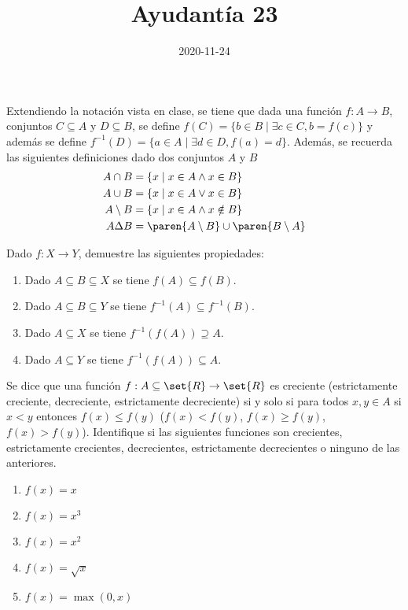 \documentclass{ayudantia}
\title{Ayudantía 23}
\date{2020-11-24}
\begin{document}
\maketitle


Extendiendo la notación vista en clase, se tiene que dada una función \(f:A\rightarrow B\), conjuntos \(C\subseteq A\) y \(D\subseteq B\), se define \(f(C)=\{b\in B\mid \exists c\in C, b=f(c)\}\) y además se define \(f^{-1}(D)=\{a\in A\mid \exists d\in D, f(a)=d\}\). Además, se recuerda las siguientes definiciones dado dos conjuntos \(A\) y \(B\)
\begin{align*}
    A\cap B      & =\{x\mid x\in A\wedge x\in B\}                \\
    A\cup B      & =\{x\mid x\in A\vee x\in B\}                  \\
    A\setminus B & =\{x\mid x\in A\wedge x\notin B\}             \\
    A\Delta B    & =\paren{A\setminus B}\cup\paren{B\setminus A} \\
\end{align*}

\begin{prob}
    Dado \(f:X\rightarrow Y\), demuestre las siguientes propiedades:
    \begin{enumerate}
        \item Dado \(A\subseteq B\subseteq X\) se tiene \(f(A)\subseteq f(B)\).
        \item Dado \(A\subseteq B\subseteq Y\) se tiene \(f^{-1}(A)\subseteq f^{-1}(B)\).
        \item Dado \(A\subseteq X\) se tiene \(f^{-1}(f(A))\supseteq A\).
        \item Dado \(A\subseteq Y\) se tiene \(f^{-1}(f(A))\subseteq A\).
    \end{enumerate}
\end{prob}

\begin{ans}
    \begin{sol}

    \end{sol}
\end{ans}



\begin{prob}
    Se dice que una función \(f:A\subseteq\set{R}\rightarrow\set{R}\) es creciente (estrictamente creciente, decreciente, estrictamente decreciente) si y solo si para todos \(x,y\in A\) si \(x<y\) entonces \(f(x)\leq f(y)\) (\(f(x)<f(y)\), \(f(x)\geq f(y)\), \(f(x)>f(y)\)). Identifique si las siguientes funciones son crecientes, estrictamente crecientes, decrecientes, estrictamente decrecientes o ninguno de las anteriores.
    \begin{enumerate}
        \item \(f(x)=x\)
        \item \(f(x)=x^3\)
        \item \(f(x)=x^2\)
        \item \(f(x)=\sqrt{x}\)
        \item \(f(x)=\max(0,x)\)
    \end{enumerate}
\end{prob}
\end{document}
